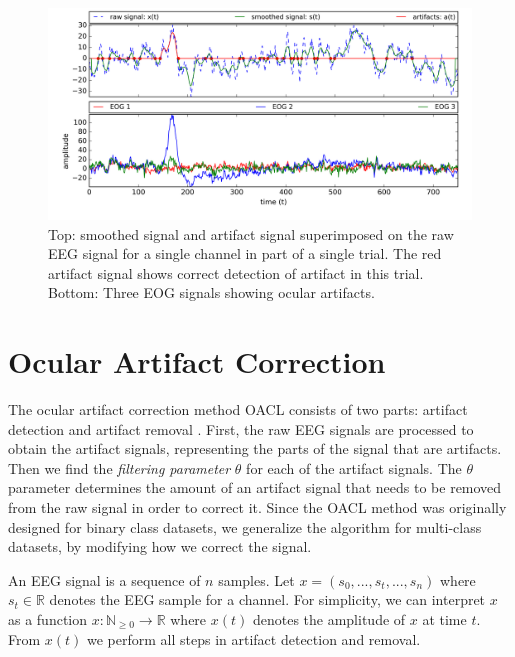 \begin{figure}%
	\centering
	\includegraphics[width=1\textwidth]{figures/oacl-signals.png}
	\vspace{-2em}
	\caption{Top: smoothed signal and artifact signal superimposed on the raw EEG signal for a single channel in part of a single trial. The red artifact signal shows correct detection of artifact in this trial. Bottom: Three EOG signals showing ocular artifacts.}
	\label{fig:oacl-signals}
\end{figure}
\section{Ocular Artifact Correction}\label{sec:oacl}
The ocular artifact correction method OACL consists of two parts: artifact detection and artifact removal \citep{li2015ocular}. First, the raw EEG signals are processed to obtain the artifact signals, representing the parts of the signal that are artifacts. Then we find the \emph{filtering parameter} $\theta$ for each of the artifact signals. The $\theta$ parameter determines the amount of an artifact signal that needs to be removed from the raw signal in order to correct it. Since the OACL method was originally designed for binary class datasets, we generalize the algorithm for multi-class datasets, by modifying how we correct the signal.

An EEG signal is a sequence of $n$ samples. Let $x = (s_0,...,s_t,...,s_n)$ where $s_t \in \mathbb{R}$ denotes the EEG sample for a channel. For simplicity, we can interpret $x$ as a function $x : \mathbb{N}_{\geq 0} \rightarrow \mathbb{R}$ where $x(t)$ denotes the amplitude of $x$ at time $t$. From $x(t)$ we perform all steps in artifact detection and removal.


